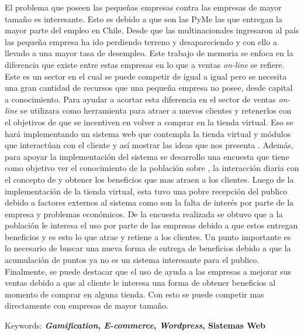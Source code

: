 El problema que poseen las pequeñas empresas contra las empresas de mayor tamaño es interesante. Esto es debido
a que son las PyMe las que entregan la mayor parte del empleo en Chile. Desde que las multinacionales ingresaron
al país las pequeña empresa ha ido perdiendo terreno y desapareciendo y con ello a llevado a una mayor tasa de 
desempleo.
Este trabajo de memoria se enfoca en la diferencia que existe entre estas empresas en lo que a ventas \emph{on-line}
se refiere. Este es un sector en el cual se puede competir de igual a igual pero se necesita una gran cantidad de 
recursos que una pequeña empresa no posee, desde capital a conocimiento. 
Para ayudar a acortar esta diferencia en el sector de ventas \emph{on-line} se utilizara {\gam} como herramienta para
atraer a nuevos clientes y retenerlos con el objetivos de que se incentiven en volver a comprar en la tienda virtual. 
Eso se hará implementando un sistema web que contempla la tienda virtual y módulos que interactúan con el cliente 
y así mostrar las ideas que nos presenta {\gam}. Además, para apoyar la implementación del sistema se desarrollo
una encuesta que tiene como objetivo ver el conocimiento de la población sobre {\gam}, la interacción diaria con el 
concepto de {\gam} y obtener los beneficios que mas atraen a los clientes.
Luego de la implementación de la tienda virtual, esta tuvo una pobre recepción del publico debido a factores
externos al sistema como son la falta de interés por parte de la empresa y problemas económicos. De la encuesta
realizada se obtuvo que a la población le interesa el uso {\gam} por parte de las empresas debido a que estos
entregan beneficios y es esto lo que atrae y retiene a los clientes. Un punto importante es lo necesario
de buscar una nueva forma de entrega de beneficios debido a que la acumulación de puntos ya no es un sistema 
interesante para el publico.
Finalmente, se puede destacar que el uso de {\gam} ayuda a las empresas a mejorar sus ventas debido a que al 
cliente le interesa una forma de obtener beneficios al momento de comprar en alguna tienda. Con esto se puede
competir mas directamente con empresas de mayor tamaño.

Keywords: \textbf{\emph{Gamification}, \emph{E-commerce}, \emph{Wordpress}, Sistemas Web}
